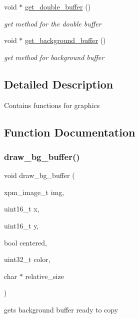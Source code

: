 \begin{DoxyCompactItemize}
void $\ast$ \hyperlink{group__Video_ga92bcd933e2fd6e75a0c7c88a0b31452f}{get\+\_\+double\+\_\+buffer} ()
\begin{DoxyCompactList}\small\item\em get method for the double buffer \end{DoxyCompactList}\item 
void $\ast$ \hyperlink{group__Video_gadda634e50b839d2f56b4ad68bf0509a3}{get\+\_\+background\+\_\+buffer} ()
\begin{DoxyCompactList}\small\item\em get method for background buffer \end{DoxyCompactList}\end{DoxyCompactItemize}


\subsection{Detailed Description}
Contains functions for graphics 

\subsection{Function Documentation}
\mbox{\label{group__Video_gad6fecc9854349e79299c1a719665b0cb}} 
\subsubsection{\texorpdfstring{draw\+\_\+bg\+\_\+buffer()}{draw\_bg\_buffer()}}
{\footnotesize\ttfamily void draw\+\_\+bg\+\_\+buffer (\begin{DoxyParamCaption}\item[{xpm\+\_\+image\+\_\+t}]{img,  }\item[{uint16\+\_\+t}]{x,  }\item[{uint16\+\_\+t}]{y,  }\item[{bool}]{centered,  }\item[{uint32\+\_\+t}]{color,  }\item[{char $\ast$}]{relative\+\_\+size }\end{DoxyParamCaption})}



gets background buffer ready to copy 


